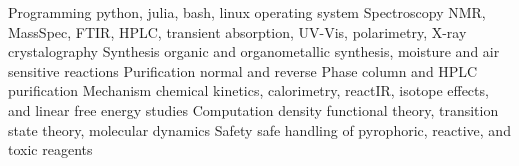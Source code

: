 

\begin{cvskills}
  \cvskill
    {Programming} %
    {python, julia, bash, linux operating system} %
  \cvskill
    {Spectroscopy} %
    {NMR, MassSpec, FTIR, HPLC, transient absorption, UV-Vis, polarimetry, X-ray crystalography} %
  \cvskill
    {Synthesis} %
    {organic and organometallic synthesis, moisture and air sensitive reactions} %
  \cvskill
  {Purification} %
  {normal and reverse Phase column and HPLC purification} %
  \cvskill
  {Mechanism} %
  {chemical kinetics, calorimetry, reactIR, isotope effects, and linear free energy studies} %
  \cvskill
  {Computation} %
  {density functional theory, transition state theory, molecular dynamics} %
  \cvskill
  {Safety} %
  {safe handling of pyrophoric, reactive, and toxic reagents} %
\end{cvskills}
